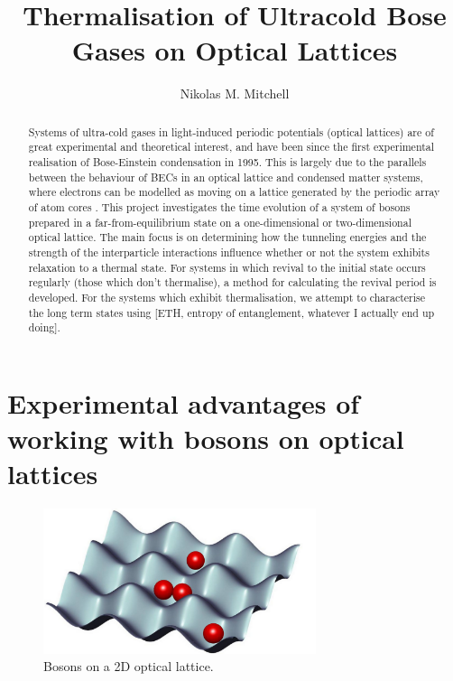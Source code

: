 \documentclass[a4paper,10pt]{article}
\title{Thermalisation of Ultracold Bose Gases on Optical Lattices}
\author{Nikolas M. Mitchell}
\begin{document}
\maketitle

\begin{abstract}

Systems of ultra-cold gases in light-induced periodic potentials (optical lattices) are of great experimental and theoretical interest, and have been since the first experimental 
realisation of Bose-Einstein condensation in 1995. 
This is largely due to the parallels between the behaviour of BECs in an optical lattice and condensed matter systems, where 
electrons can be modelled as moving on a lattice generated by the periodic array of atom cores \cite{Bloch2012}. This project 
investigates the time evolution of a system of bosons prepared in a far-from-equilibrium state on a one-dimensional or two-dimensional
optical lattice. The main focus is on determining how the tunneling energies and the strength of the interparticle interactions influence
whether or not the system exhibits relaxation to a thermal state. For systems in which revival to the initial state occurs regularly (those which don't thermalise), 
a method for calculating the revival period is developed. For the systems which exhibit thermalisation, we attempt to characterise the long term
states using [ETH, entropy of entanglement, whatever I actually end up doing].



\end{abstract}
\newpage
\section{Experimental advantages of working with bosons on optical lattices}
 
\begin{figure}[H]
 \begin{center}
   \includegraphics[width=8cm]{bosons_on_lattice}
 \end{center}
 \caption{Bosons on a 2D optical lattice.}
 \end{figure}
\end{document}
